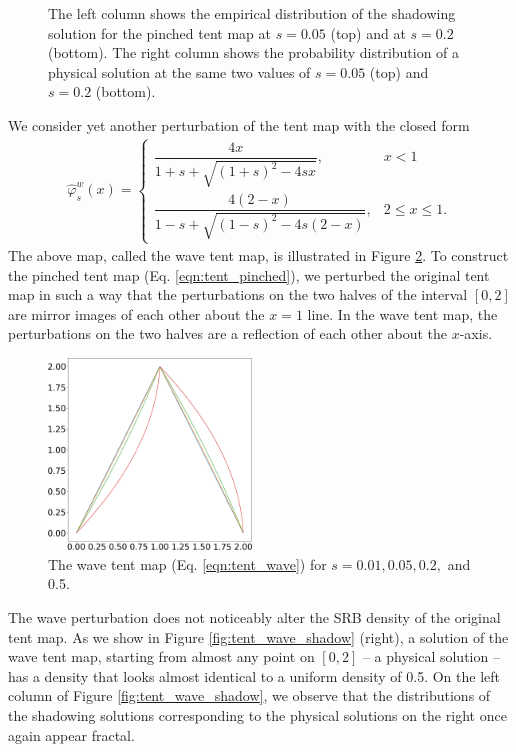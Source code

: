 \begin{figure}
    \caption{The left column shows the empirical distribution of the shadowing solution for the pinched tent map at $s=0.05$ (top) and at $s=0.2$ (bottom). The right column shows the probability distribution of a physical solution at the same two values of $s = 0.05$ (top) and $s = 0.2$ (bottom).}
    \label{fig:tent_pinched_shadow}
\end{figure}
We consider yet another perturbation of the tent map with the closed form
\begin{align}
\hat{\varphi}^w_s(x) = \begin{cases}
        \dfrac{4x}{1 + s + \sqrt{(1+s)^2 - 4s x} }, & x < 1 \\
        \dfrac{4(2-x)}{1 - s + \sqrt{(1-s)^2 - 4s(2- x)} }, & 2 \leq x \leq 1.
    \end{cases}
    \label{eqn:tent_wave}
\end{align}
The above map, called the wave tent map, is illustrated in Figure \ref{fig:tent_wave}.
To construct the pinched tent map (Eq. \ref{eqn:tent_pinched}), we perturbed the original tent map in such a way that the perturbations on the two halves of the interval $[0,2]$ are mirror images of each other about the $x=1$ line. In the wave tent map, the perturbations on the two halves are a reflection of each other about the 
$x$-axis.
\begin{figure}
    \centering
    \includegraphics[width=0.48\textwidth]{wave_tent_map.png}
    \caption{The wave tent map (Eq. \ref{eqn:tent_wave}) for $s = 0.01, 0.05, 0.2,$ and 0.5.}
    \label{fig:tent_wave}
\end{figure}
The wave perturbation does not noticeably alter the SRB density of the original tent map. As we show in Figure \ref{fig:tent_wave_shadow} (right), a solution of the 
wave tent map, starting from almost any point on $[0,2]$ -- a physical solution -- has a density that looks almost identical to a uniform density of 0.5. On the left column of Figure \ref{fig:tent_wave_shadow}, we observe that the distributions of the shadowing solutions corresponding to the physical solutions on the right once again appear fractal.  
